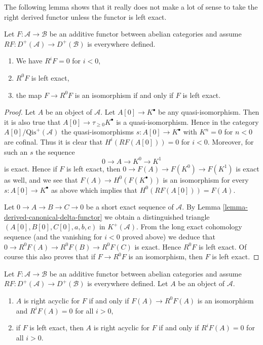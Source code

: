 \noindent
The following lemma shows that it really does not make a lot
of sense to take the right derived functor unless the functor
is left exact.

\begin{lemma}
\label{lemma-left-exact-higher-derived}
Let $F : \mathcal{A} \to \mathcal{B}$ be an additive functor
between abelian categories and assume
$RF : D^{+}(\mathcal{A}) \to D^{+}(\mathcal{B})$ is everywhere
defined.
\begin{enumerate}
\item We have $R^iF = 0$ for $i < 0$,
\item $R^0F$ is left exact,
\item the map $F \to R^0F$ is an isomorphism if and
only if $F$ is left exact.
\end{enumerate}
\end{lemma}

\begin{proof}
Let $A$ be an object of $\mathcal{A}$. Let $A[0] \to K^\bullet$
be any quasi-isomorphism. Then it is also true that
$A[0] \to \tau_{\geq 0}K^\bullet$ is a quasi-isomorphism.
Hence in the category $A[0]/\text{Qis}^{+}(\mathcal{A})$ the
quasi-isomorphisms $s : A[0] \to K^\bullet$ with $K^n = 0$ for $n < 0$
are cofinal. Thus it is clear that $H^i(RF(A[0])) = 0$ for $i < 0$.
Moreover, for such an $s$ the sequence
$$
0 \to A \to K^0 \to K^1
$$
is exact. Hence if $F$ is left exact, then $0 \to F(A) \to F(K^0) \to F(K^1)$
is exact as well, and we see that $F(A) \to H^0(F(K^\bullet))$ is an
isomorphism for every $s : A[0] \to K^\bullet$ as above which implies
that $H^0(RF(A[0])) = F(A)$.

\medskip\noindent
Let $0 \to A \to B \to C \to 0$ be a short exact sequence of $\mathcal{A}$.
By
Lemma \ref{lemma-derived-canonical-delta-functor}
we obtain a distinguished triangle
$(A[0], B[0], C[0], a, b, c)$ in $K^{+}(\mathcal{A})$.
From the long exact cohomology sequence (and the vanishing for $i < 0$
proved above) we deduce that $0 \to R^0F(A) \to R^0F(B) \to R^0F(C)$
is exact. Hence $R^0F$ is left exact. Of course this also proves that if
$F \to R^0F$ is an isomorphism, then $F$ is left exact.
\end{proof}

\begin{lemma}
\label{lemma-F-acyclic}
Let $F : \mathcal{A} \to \mathcal{B}$ be an additive functor
between abelian categories and assume
$RF : D^{+}(\mathcal{A}) \to D^{+}(\mathcal{B})$ is everywhere
defined. Let $A$ be an object of $\mathcal{A}$.
\begin{enumerate}
\item $A$ is right acyclic for $F$ if and only if
$F(A) \to R^0F(A)$ is an isomorphism and $R^iF(A) = 0$ for all $i > 0$,
\item if $F$ is left exact, then $A$ is right acyclic for $F$
if and only if $R^iF(A) = 0$ for all $i > 0$.
\end{enumerate}
\end{lemma}

